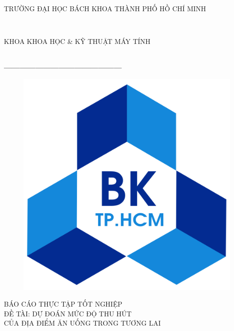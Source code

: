 \documentclass[12pt]{extarticle}
\begin{document}
\begin{titlepage}
	\thispagestyle{empty}
	\thisfancypage{
	\setlength{\fboxsep}{0pt}
	\fbox}{} 
	\begin{center}
		\begin{large}
			TRƯỜNG ĐẠI HỌC BÁCH KHOA THÀNH PHỐ HỒ CHÍ MINH
		\end{large} \\	
		\begin{large}
			KHOA KHOA HỌC \& KỸ THUẬT MÁY TÍNH
		\end{large} \\
		\textbf{---------------------------------------------}\\[1cm]

		\begin{figure}[h!]
			\includegraphics[scale=0.1]{logo}
			\centering
		\end{figure}

		\vspace{1cm}

		{\fontsize{40pt}{1}\selectfont BÁO CÁO THỰC TẬP TỐT NGHIỆP}\\
		{\fontsize{20pt}{1}\selectfont ĐỀ TÀI: DỰ ĐOÁN MỨC ĐỘ THU HÚT \\ CỦA ĐỊA ĐIỂM ĂN UỐNG TRONG TƯƠNG LAI}\\[3cm]
	\end{center}


\end{titlepage}
\end{document}
